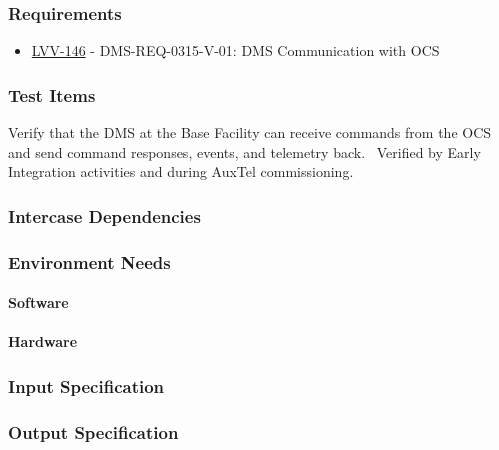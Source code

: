 \subsubsection{Requirements}
\begin{itemize}
\item \href{https://jira.lsstcorp.org/browse/LVV-146}{LVV-146} - DMS-REQ-0315-V-01: DMS Communication with OCS
\end{itemize}

\subsubsection{Test Items}
Verify that the DMS at the Base Facility can receive commands from the
OCS and send command responses, events, and telemetry back. ~Verified by
Early Integration activities and during AuxTel commissioning.



\subsubsection{Intercase Dependencies}

\subsubsection{Environment Needs}

\paragraph{Software}

\paragraph{Hardware}

\subsubsection{Input Specification}

\subsubsection{Output Specification}


